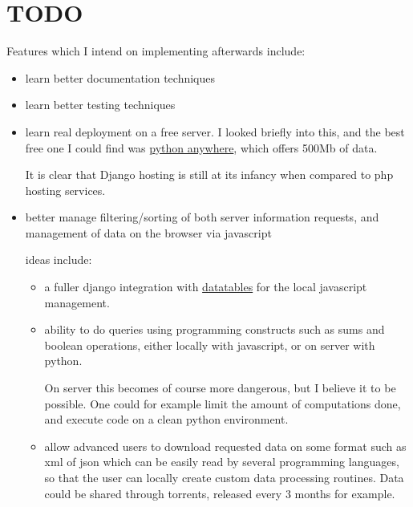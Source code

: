 \documentclass[12pt]{article}
\begin{document}
\section{TODO} \label{todo}

Features which I intend on implementing afterwards include:

\begin{itemize}

  \item learn better documentation techniques

  \item learn better testing techniques
  
  \item learn real deployment on a free server. I looked briefly into this, and the best
    free one I could find was \href{https://www.pythonanywhere.com/}{python anywhere},
    which offers 500Mb of data.
    
    It is clear that Django hosting is still at its infancy when compared to php hosting
    services.

  \item better manage filtering/sorting of both server information requests,
    and management of data on the browser via javascript
    
    ideas include:
    
    \begin{itemize}
      \item a fuller django integration with \href{http://www.datatables.net}{datatables} for the
        local javascript management.
        
      \item ability to do queries using programming constructs such as sums and boolean operations,
        either locally with javascript, or on server with python.
        
        On server this becomes of course more dangerous, but I believe it to be possible. One could
        for example limit the amount of computations done, and execute code on a clean python environment.
      
      \item allow advanced users to download requested data on some
        format such as xml of json which can be easily read by several programming languages,
        so that the user can locally create custom data processing routines. Data could be shared
        through torrents, released every 3 months for example.
    \end{itemize}


\end{itemize}
\end{document}

